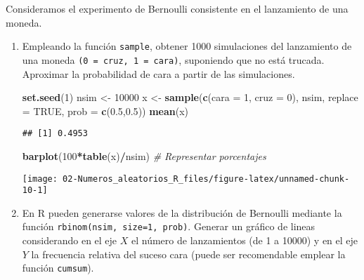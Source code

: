 \documentclass[
]{book}
\newenvironment{Shaded}{\begin{snugshade}}{\end{snugshade}}
\newcommand{\CommentTok}[1]{\textcolor[rgb]{0.56,0.35,0.01}{\textit{#1}}}
\newcommand{\DataTypeTok}[1]{\textcolor[rgb]{0.13,0.29,0.53}{#1}}
\newcommand{\DecValTok}[1]{\textcolor[rgb]{0.00,0.00,0.81}{#1}}
\newcommand{\FloatTok}[1]{\textcolor[rgb]{0.00,0.00,0.81}{#1}}
\newcommand{\KeywordTok}[1]{\textcolor[rgb]{0.13,0.29,0.53}{\textbf{#1}}}
\newcommand{\NormalTok}[1]{#1}
\newcommand{\OperatorTok}[1]{\textcolor[rgb]{0.81,0.36,0.00}{\textbf{#1}}}
\newcommand{\OtherTok}[1]{\textcolor[rgb]{0.56,0.35,0.01}{#1}}
\newcommand{\StringTok}[1]{\textcolor[rgb]{0.31,0.60,0.02}{#1}}
\theoremstyle{break}
\theoremstyle{definition}
\theoremstyle{definition}
\theoremstyle{definition}
\theoremstyle{remark}
\let\BeginKnitrBlock\begin \let\EndKnitrBlock\end
\begin{document}
\BeginKnitrBlock{exercise}
\protect\hypertarget{exr:unnamed-chunk-9}{}{\label{exr:unnamed-chunk-9} }
\EndKnitrBlock{exercise}

Consideramos el experimento de Bernoulli consistente en el
lanzamiento de una moneda.

\begin{enumerate}
\def\labelenumi{\alph{enumi})}
\item
  Empleando la función \texttt{sample}, obtener 1000 simulaciones del
  lanzamiento de una moneda \texttt{(0\ =\ cruz,\ 1\ =\ cara)}, suponiendo que
  no está trucada. Aproximar la probabilidad de cara a partir de
  las simulaciones.

\begin{Shaded}
\begin{Highlighting}[]
\KeywordTok{set.seed}\NormalTok{(}\DecValTok{1}\NormalTok{)}
\NormalTok{nsim <-}\StringTok{ }\DecValTok{10000}
\NormalTok{x <-}\StringTok{ }\KeywordTok{sample}\NormalTok{(}\KeywordTok{c}\NormalTok{(}\DataTypeTok{cara =} \DecValTok{1}\NormalTok{, }\DataTypeTok{cruz =} \DecValTok{0}\NormalTok{), nsim, }\DataTypeTok{replace =} \OtherTok{TRUE}\NormalTok{, }\DataTypeTok{prob =} \KeywordTok{c}\NormalTok{(}\FloatTok{0.5}\NormalTok{,}\FloatTok{0.5}\NormalTok{))}
\KeywordTok{mean}\NormalTok{(x)}
\end{Highlighting}
\end{Shaded}

\begin{verbatim}
## [1] 0.4953
\end{verbatim}

\begin{Shaded}
\begin{Highlighting}[]
\KeywordTok{barplot}\NormalTok{(}\DecValTok{100}\OperatorTok{*}\KeywordTok{table}\NormalTok{(x)}\OperatorTok{/}\NormalTok{nsim) }\CommentTok{# Representar porcentajes }
\end{Highlighting}
\end{Shaded}

  \begin{center}\texttt{[image: 02-Numeros\_aleatorios\_R\_files/figure-latex/unnamed-chunk-10-1]} \end{center}
\item
  En R pueden generarse valores de la distribución de Bernoulli
  mediante la función \texttt{rbinom(nsim,\ size=1,\ prob)}. Generar un
  gráfico de lineas considerando en el eje \(X\) el número de
  lanzamientos (de 1 a 10000) y en el eje \(Y\) la frecuencia
  relativa del suceso cara (puede ser recomendable emplear la
  función \texttt{cumsum}).


\end{enumerate}
\end{document}
